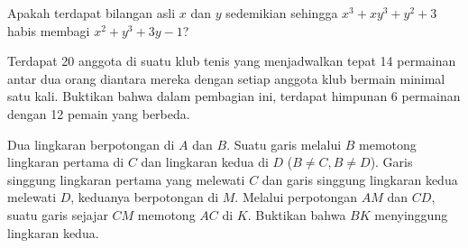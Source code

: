 \documentclass[11pt]{scrartcl}
\begin{document}
	\begin{soalbaru} Apakah terdapat bilangan asli $x$ dan $y$ sedemikian sehingga $x^3+xy^3+y^2+3$ habis membagi $x^2+y^3+3y-1$?
	\end{soalbaru}
	
	\begin{soalbaru} Terdapat 20 anggota di suatu klub tenis yang menjadwalkan tepat 14 permainan antar dua orang diantara mereka dengan setiap anggota klub bermain minimal satu kali. Buktikan bahwa dalam pembagian ini, terdapat himpunan 6 permainan dengan 12 pemain yang berbeda.
	\end{soalbaru}
	
	\begin{soalbaru} Dua lingkaran berpotongan di $A$ dan $B$. Suatu garis melalui $B$ memotong lingkaran pertama di $C$ dan lingkaran kedua di $D$ ($B \neq C, B \neq D$).  Garis singgung lingkaran pertama yang melewati $C$ dan garis singgung lingkaran kedua melewati $D$, keduanya berpotongan di $M$. Melalui perpotongan $AM$ dan $CD$, suatu garis sejajar $CM$ memotong $AC$ di $K$. Buktikan bahwa $BK$ menyinggung lingkaran kedua.
	\end{soalbaru}
	
\end{document}
